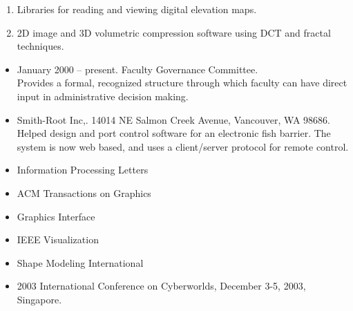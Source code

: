 \documentclass[12pt]{article}
\begin{document}
\vspace{0.25cm}


\begin{enumerate}
\item Libraries for reading and viewing digital elevation maps.
\item 2D image and 3D volumetric compression software using
  DCT and fractal techniques.
\end{enumerate}

\vspace{0.25cm}


\begin{itemize}
\item January 2000 -- present. Faculty Governance Committee.\\
  Provides a formal, recognized structure through which faculty can have
  direct input in administrative decision making.
\end{itemize}

\vspace{0.25cm}


\begin{itemize}
\item Smith-Root Inc,. 14014 NE Salmon Creek Avenue, Vancouver, WA 98686.\\
Helped design and port control software for an
electronic fish barrier. The system is now web based, and uses a 
client/server protocol for remote control.
\end{itemize}



\begin{itemize}
\item Information Processing Letters
\item ACM Transactions on Graphics
\item Graphics Interface
\item IEEE Visualization
\item Shape Modeling International
\item 2003 International Conference on Cyberworlds, 
   December 3-5, 2003, Singapore.
\end{itemize}
\end{document}

